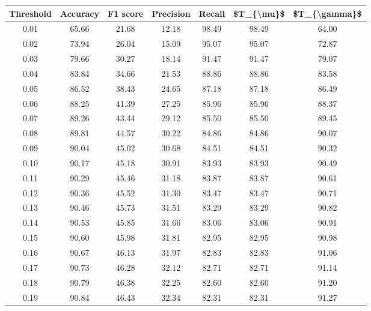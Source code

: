 \begin{tabular}{|c|c|c|c|c|c|c|}
\toprule
 Threshold &  Accuracy &  F1 score &  Precision &  Recall &  \$T\_\{\textbackslash mu\}\$ &  \$T\_\{\textbackslash gamma\}\$ \\
\hline
      0.01 &     65.66 &     21.68 &      12.18 &   98.49 &      98.49 &         64.00 \\
      0.02 &     73.94 &     26.04 &      15.09 &   95.07 &      95.07 &         72.87 \\
      0.03 &     79.66 &     30.27 &      18.14 &   91.47 &      91.47 &         79.07 \\
      0.04 &     83.84 &     34.66 &      21.53 &   88.86 &      88.86 &         83.58 \\
      0.05 &     86.52 &     38.43 &      24.65 &   87.18 &      87.18 &         86.49 \\
      0.06 &     88.25 &     41.39 &      27.25 &   85.96 &      85.96 &         88.37 \\
      0.07 &     89.26 &     43.44 &      29.12 &   85.50 &      85.50 &         89.45 \\
      0.08 &     89.81 &     44.57 &      30.22 &   84.86 &      84.86 &         90.07 \\
      0.09 &     90.04 &     45.02 &      30.68 &   84.51 &      84.51 &         90.32 \\
      0.10 &     90.17 &     45.18 &      30.91 &   83.93 &      83.93 &         90.49 \\
      0.11 &     90.29 &     45.46 &      31.18 &   83.87 &      83.87 &         90.61 \\
      0.12 &     90.36 &     45.52 &      31.30 &   83.47 &      83.47 &         90.71 \\
      0.13 &     90.46 &     45.73 &      31.51 &   83.29 &      83.29 &         90.82 \\
      0.14 &     90.53 &     45.85 &      31.66 &   83.06 &      83.06 &         90.91 \\
      0.15 &     90.60 &     45.98 &      31.81 &   82.95 &      82.95 &         90.98 \\
      0.16 &     90.67 &     46.13 &      31.97 &   82.83 &      82.83 &         91.06 \\
      0.17 &     90.73 &     46.28 &      32.12 &   82.71 &      82.71 &         91.14 \\
      0.18 &     90.79 &     46.38 &      32.25 &   82.60 &      82.60 &         91.20 \\
      0.19 &     90.84 &     46.43 &      32.34 &   82.31 &      82.31 &         91.27 \\

\end{tabular}
